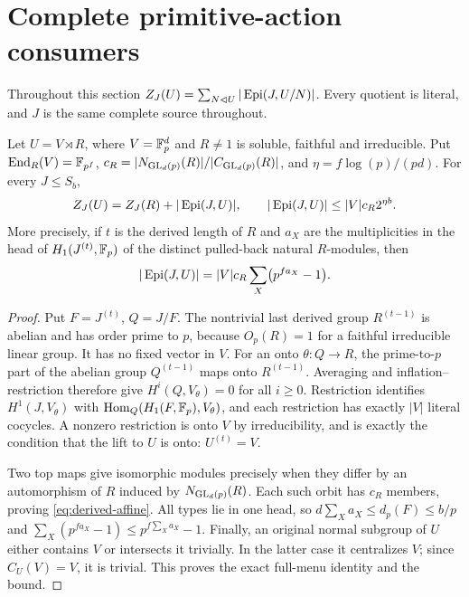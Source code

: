\section{Complete primitive-action consumers}\label{sec:primitive-consumers}
Throughout this section $Z_J(U)=\sum_{N\lhd U}|\operatorname{Epi}(J,U/N)|$.
Every quotient is literal, and $J$ is the same complete source throughout.

\begin{lemma}
\label{lem:derived-affine}
Let $U=V\rtimes R$, where $V=\mathbb F_p^d$ and $R\ne1$ is soluble,
faithful and irreducible. Put $\operatorname{End}_R(V)=\mathbb F_{p^f}$,
$c_R=|N_{\operatorname{GL}_d(p)}(R)|/|C_{\operatorname{GL}_d(p)}(R)|$, and
$\eta=f\log(p)/(pd)$. For every $J\leq S_b$,
\[
 Z_J(U)=Z_J(R)+|\operatorname{Epi}(J,U)|,
 \qquad |\operatorname{Epi}(J,U)|\leq|V|c_R2^{\eta b}.
\]
More precisely, if $t$ is the derived length of $R$ and $a_X$
are the multiplicities in the head of $H_1(J^{(t)},\mathbb F_p)$ of
the distinct pulled-back natural $R$-modules, then
\begin{equation}\label{eq:derived-affine}
 |\operatorname{Epi}(J,U)|=|V|c_R\sum_X\bigl(p^{fa_X}-1\bigr).
\end{equation}
\end{lemma}
\begin{proof}
Put $F=J^{(t)}$, $Q=J/F$. The nontrivial last derived group
$R^{(t-1)}$ is abelian and has order prime to $p$, because
$O_p(R)=1$ for a faithful irreducible linear group. It has no
fixed vector in $V$. For an onto $\theta:Q\to R$, the
prime-to-$p$ part of the abelian group $Q^{(t-1)}$ maps onto
$R^{(t-1)}$. Averaging and inflation--restriction therefore
give $H^i(Q,V_\theta)=0$ for all $i\geq0$.
Restriction identifies
$H^1(J,V_\theta)$ with
$\operatorname{Hom}_Q(H_1(F,\mathbb F_p),V_\theta)$, and each restriction has
exactly $|V|$ literal cocycles. A nonzero restriction is onto
$V$ by irreducibility, and is exactly the condition that the
lift to $U$ is onto: $U^{(t)}=V$.

Two top maps give isomorphic modules precisely when they differ
by an automorphism of $R$ induced by $N_{\operatorname{GL}_d(p)}(R)$.
Each such orbit has $c_R$ members, proving
\eqref{eq:derived-affine}. All types lie in one head, so
$d\sum_Xa_X\leq d_p(F)\leq b/p$ and
$\sum_X(p^{fa_X}-1)\leq p^{f\sum_Xa_X}-1$.
Finally, an original normal subgroup of $U$ either contains $V$
or intersects it trivially. In the latter case it centralizes
$V$; since $C_U(V)=V$, it is trivial. This proves the exact
full-menu identity and the bound.
\end{proof}

